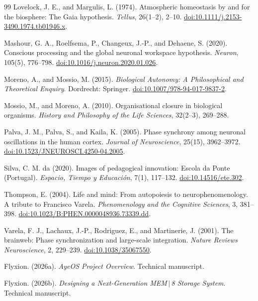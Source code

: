 \documentclass[11pt]{article}
\begin{document}
\begin{thebibliography}{99}
Lovelock, J. E., and Margulis, L. (1974). Atmospheric homeostasis by and for the biosphere: The Gaia hypothesis. \emph{Tellus}, 26(1--2), 2--10. \href{https://doi.org/10.1111/j.2153-3490.1974.tb01946.x}{doi:10.1111/j.2153-3490.1974.tb01946.x}.

Mashour, G. A., Roelfsema, P., Changeux, J.-P., and Dehaene, S. (2020). Conscious processing and the global neuronal workspace hypothesis. \emph{Neuron}, 105(5), 776--798. \href{https://doi.org/10.1016/j.neuron.2020.01.026}{doi:10.1016/j.neuron.2020.01.026}.

Moreno, A., and Mossio, M. (2015). \emph{Biological Autonomy: A Philosophical and Theoretical Enquiry}. Dordrecht: Springer. \href{https://doi.org/10.1007/978-94-017-9837-2}{doi:10.1007/978-94-017-9837-2}.

Mossio, M., and Moreno, A. (2010). Organisational closure in biological organisms. \emph{History and Philosophy of the Life Sciences}, 32(2--3), 269--288.

Palva, J. M., Palva, S., and Kaila, K. (2005). Phase synchrony among neuronal oscillations in the human cortex. \emph{Journal of Neuroscience}, 25(15), 3962--3972. \href{https://doi.org/10.1523/JNEUROSCI.4250-04.2005}{doi:10.1523/JNEUROSCI.4250-04.2005}.

Silva, C. M. da (2020). Images of pedagogical innovation: Escola da Ponte (Portugal). \emph{Espacio, Tiempo y Educación}, 7(1), 117--132. \href{https://doi.org/10.14516/ete.302}{doi:10.14516/ete.302}.

Thompson, E. (2004). Life and mind: From autopoiesis to neurophenomenology. A tribute to Francisco Varela. \emph{Phenomenology and the Cognitive Sciences}, 3, 381--398. \href{https://doi.org/10.1023/B:PHEN.0000048936.73339.dd}{doi:10.1023/B:PHEN.0000048936.73339.dd}.

Varela, F. J., Lachaux, J.-P., Rodriguez, E., and Martinerie, J. (2001). The brainweb: Phase synchronization and large-scale integration. \emph{Nature Reviews Neuroscience}, 2, 229--239. \href{https://doi.org/10.1038/35067550}{doi:10.1038/35067550}.

Flyxion. (2026a). \emph{AyeOS Project Overview}. Technical manuscript.

Flyxion. (2026b). \emph{Designing a Next-Generation MEM\,$|$\,8 Storage System}. Technical manuscript.


\end{thebibliography}
\end{document}
